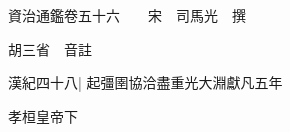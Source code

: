 






























































資治通鑑卷五十六　　宋　司馬光　撰

胡三省　音註

漢紀四十八|{
	起彊圉協洽盡重光大淵獻凡五年}


孝桓皇帝下

